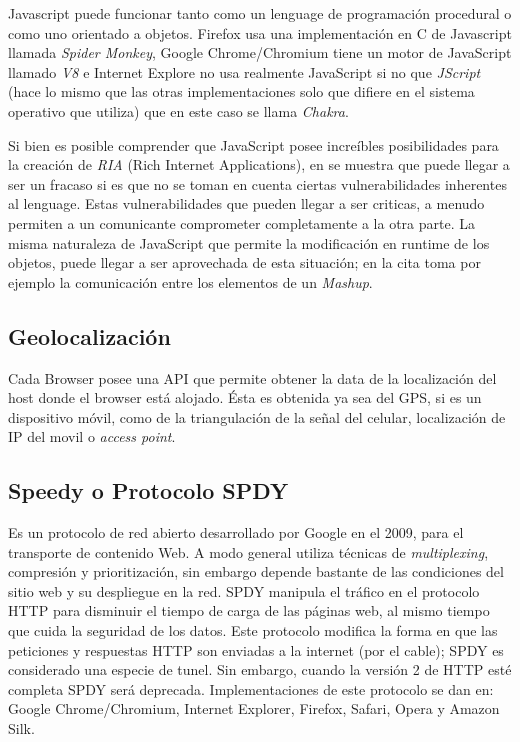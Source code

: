     Javascript puede funcionar tanto como un lenguage de programación procedural o como uno orientado a objetos. Firefox usa una implementación en C de Javascript llamada \textit{Spider Monkey}, Google Chrome/Chromium tiene un motor de JavaScript llamado \textit{V8} e Internet Explore no usa realmente JavaScript si no que \textit{JScript} (hace lo mismo que las otras implementaciones solo que difiere en el sistema operativo que utiliza) que en este caso se llama \textit{Chakra}.
            
    Si bien es posible comprender que JavaScript posee increíbles posibilidades para la creación de \textit{RIA} (Rich Internet Applications), en \cite{barth2009attacks} se muestra que puede llegar a ser un fracaso si es que no se toman en cuenta ciertas vulnerabilidades inherentes al lenguage. Estas vulnerabilidades que pueden llegar a ser criticas, a menudo permiten a un comunicante comprometer completamente a la otra parte. La misma naturaleza de JavaScript que permite la modificación en runtime de los objetos, puede llegar a ser aprovechada de esta situación; en la cita toma por ejemplo la comunicación entre los elementos de un \textit{Mashup}.


    \subsection{Geolocalización}
    Cada Browser posee una API que permite obtener la data de la localización del host donde el browser está alojado. Ésta es obtenida ya sea del GPS, si es un dispositivo móvil, como de la triangulación de la señal del celular, localización de IP del movil o \textit{access point}.


    \subsection{Speedy o Protocolo SPDY}
    \label{chap2:spdy}
    Es un protocolo de red abierto desarrollado por Google en el 2009, para el transporte de contenido Web. A modo general utiliza técnicas de \textit{multiplexing}, compresión y prioritización, sin embargo depende bastante de las condiciones del sitio web y su despliegue en la red. SPDY manipula el tráfico en el protocolo HTTP para disminuir el tiempo de carga de las páginas web, al mismo tiempo que cuida la seguridad de los datos. Este protocolo modifica la forma en que las peticiones y respuestas HTTP son enviadas a la internet (por el cable); SPDY es considerado una especie de tunel. Sin embargo, cuando la versión 2 de HTTP esté completa SPDY será deprecada. Implementaciones de este protocolo se dan en: Google Chrome/Chromium, Internet Explorer, Firefox, Safari, Opera y Amazon Silk.

